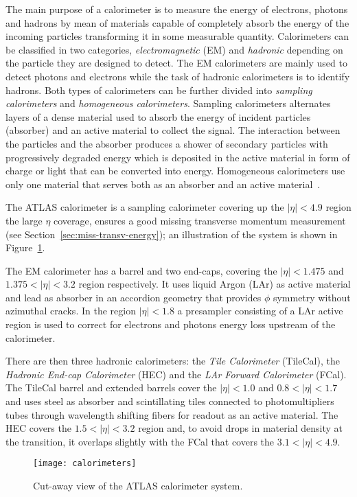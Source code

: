 The main purpose of a calorimeter is to measure the energy of electrons, photons
and hadrons by mean of materials capable of completely absorb the energy of the
incoming particles transforming it in some measurable quantity. Calorimeters can
be classified in two categories, \emph{electromagnetic} (EM) and \emph{hadronic}
depending on the particle they are designed to detect. The EM calorimeters are
mainly used to detect photons and electrons while the task of hadronic
calorimeters is to identify hadrons. Both types of calorimeters can be further
divided into \emph{sampling calorimeters} and \emph{homogeneous
  calorimeters}. Sampling calorimeters alternates layers of a dense material
used to absorb the energy of incident particles (absorber) and an active
material to collect the signal. The interaction between the particles and the
absorber produces a shower of secondary particles with progressively degraded
energy which is deposited in the active material in form of charge or light that
can be converted into energy. Homogeneous calorimeters use only one material
that serves both as an absorber and an active material~\cite{Calorimetry}.

The ATLAS calorimeter is a sampling calorimeter covering up the $|\eta| < 4.9$
region the large $\eta$ coverage, ensures a good missing transverse momentum
measurement (see Section~\ref{sec:miss-transv-energy}); an illustration of the
system is shown in Figure~\ref{fig:calo}.

The EM calorimeter has a barrel and two end-caps, covering the $|\eta| < 1.475$
and $1.375 < |\eta| < 3.2$ region respectively. It uses liquid Argon (LAr) as
active material and lead as absorber in an accordion geometry that provides
$\phi$ symmetry without azimuthal cracks. In the region $|\eta| < 1.8$ a
presampler consisting of a LAr active region is used to correct for electrons
and photons energy loss upstream of the calorimeter.

There are then three hadronic calorimeters: the \emph{Tile Calorimeter}
(TileCal), the \emph{Hadronic End-cap Calorimeter} (HEC) and the \emph{LAr
  Forward Calorimeter} (FCal). The TileCal barrel and extended barrels cover the
$|\eta| < 1.0$ and $0.8 < |\eta| < 1.7$ and uses steel as absorber and
scintillating tiles connected to photomultipliers tubes through wavelength
shifting fibers for readout as an active material. The HEC covers the
$1.5 < |\eta| < 3.2$ region and, to avoid drops in material density at the
transition, it overlaps slightly with the FCal that covers the
$3.1 < |\eta| < 4.9$.

\begin{figure}[!h]
  \centering
    \texttt{[image: calorimeters]}
    \caption{Cut-away view of the ATLAS calorimeter system.}
    \label{fig:calo}
\end{figure}
